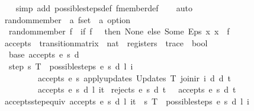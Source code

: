 \begin{isabellebody}
\ \ \isamarkupfalse%
\ {\isacharparenleft}simp\ add{\isacharcolon}\ possible{\isacharunderscore}steps{\isacharunderscore}def\ fmember{\isacharunderscore}def{\isacharparenright}\isanewline
\ \ \isamarkupfalse%
\ auto%
\endisatagproof
{\isafoldproof}%
%
\isadelimproof
\isanewline
%
\endisadelimproof
\isanewline
{}\isamarkupfalse%
\ random{\isacharunderscore}member\ {\isacharcolon}{\isacharcolon}\ {\isachardoublequoteopen}{\isacharprime}a\ fset\ {\isasymRightarrow}\ {\isacharprime}a\ option{\isachardoublequoteclose}\ \isanewline
\ \ {\isachardoublequoteopen}random{\isacharunderscore}member\ f\ {\isacharequal}\ {\isacharparenleft}if\ f\ {\isacharequal}\ {\isacharbraceleft}{\isacharbar}{\isacharbar}{\isacharbraceright}\ then\ None\ else\ Some\ {\isacharparenleft}Eps\ {\isacharparenleft}{\isasymlambda}x{\isachardot}\ x\ {\isacharbar}{\isasymin}{\isacharbar}\ f{\isacharparenright}{\isacharparenright}{\isacharparenright}{\isachardoublequoteclose}\isanewline
\isanewline
{}\isamarkupfalse%
\ accepts\ {\isacharcolon}{\isacharcolon}\ {\isachardoublequoteopen}transition{\isacharunderscore}matrix\ {\isasymRightarrow}\ nat\ {\isasymRightarrow}\ registers\ {\isasymRightarrow}\ trace\ {\isasymRightarrow}\ bool{\isachardoublequoteclose}\ \isanewline
\ \ base{\isacharcolon}\ {\isachardoublequoteopen}accepts\ e\ s\ d\ {\isacharbrackleft}{\isacharbrackright}{\isachardoublequoteclose}\ {\isacharbar}\ \ \ \ \ \ \ \ \ \ \ \ \ \ \ \ \ \ \ \ \ \ \ \ \ \ \ \ \ \ \ \ \ \ \ \ \ \ \ \ \ \isanewline
\ \ step{\isacharcolon}\ {\isachardoublequoteopen}{\isasymexists}{\isacharparenleft}s{\isacharprime}{\isacharcomma}\ T{\isacharparenright}\ {\isacharbar}{\isasymin}{\isacharbar}\ possible{\isacharunderscore}steps\ e\ s\ d\ l\ i{\isachardot}\isanewline
\ \ \ \ \ \ \ \ \ accepts\ e\ s{\isacharprime}\ {\isacharparenleft}apply{\isacharunderscore}updates\ {\isacharparenleft}Updates\ T{\isacharparenright}\ {\isacharparenleft}join{\isacharunderscore}ir\ i\ d{\isacharparenright}\ d{\isacharparenright}\ t\ {\isasymLongrightarrow}\isanewline
\ \ \ \ \ \ \ \ \ accepts\ e\ s\ d\ {\isacharparenleft}{\isacharparenleft}l{\isacharcomma}\ i{\isacharparenright}{\isacharhash}t{\isacharparenright}{\isachardoublequoteclose}\isanewline
\isanewline
{}\isamarkupfalse%
\ {\isachardoublequoteopen}rejects\ e\ s\ d\ t\ {\isasymequiv}\ {\isasymnot}\ accepts\ e\ s\ d\ t{\isachardoublequoteclose}\isanewline
\isanewline
{}\isamarkupfalse%
\ accepts{\isacharunderscore}step{\isacharunderscore}equiv{\isacharcolon}\ {\isachardoublequoteopen}accepts\ e\ s\ d\ {\isacharparenleft}{\isacharparenleft}l{\isacharcomma}\ i{\isacharparenright}{\isacharhash}t{\isacharparenright}\ {\isacharequal}\ {\isacharparenleft}{\isasymexists}{\isacharparenleft}s{\isacharprime}{\isacharcomma}\ T{\isacharparenright}\ {\isacharbar}{\isasymin}{\isacharbar}\ possible{\isacharunderscore}steps\ e\ s\ d\ l\ i{\isachardot}\isanewline

\end{isabellebody}
